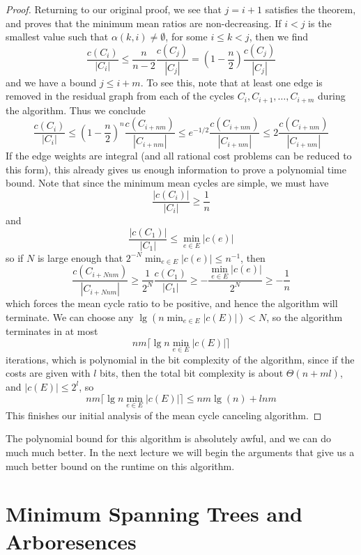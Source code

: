 \begin{proof}
    Returning to our original proof, we see that $j = i+1$ satisfies the theorem, and proves that the minimum mean ratios are non-decreasing. If $i < j$ is the smallest value such that $\alpha(k,i) \neq \emptyset$, for some $i \leq k < j$, then we find
    \[ \frac{c(C_i)}{|C_i|} \leq \frac{n}{n - 2} \frac{c(C_j)}{|C_j|} = \left(1 - \frac{n}{2} \right) \frac{c(C_j)}{|C_j|} \]
    and we have a bound $j \leq i + m$. To see this, note that at least one edge is removed in the residual graph from each of the cycles $C_i, C_{i+1}, \dots, C_{i+m}$ during the algorithm. Thus we conclude
    \[ \frac{c(C_i)}{|C_i|} \leq \left( 1 - \frac{n}{2} \right)^n \frac{c(C_{i+nm})}{|C_{i+nm}|} \leq e^{-1/2} \frac{c(C_{i+nm})}{|C_{i+nm}|} \leq 2 \frac{c(C_{i+nm})}{|C_{i+nm}|} \]
    If the edge weights are integral (and all rational cost problems can be reduced to this form), this already gives us enough information to prove a polynomial time bound. Note that since the minimum mean cycles are simple, we must have
    \[ \frac{|c(C_i)|}{|C_i|} \geq \frac{1}{n} \]
    and
    \[ \frac{|c(C_1)|}{|C_1|} \leq \min_{e \in E} |c(e)| \]
    so if $N$ is large enough that $2^{-N} \min_{e \in E} |c(e)| \leq n^{-1}$, then
    \[ \frac{c(C_{i+Nnm})}{|C_{i+Nnm}|} \geq \frac{1}{2^N} \frac{c(C_1)}{|C_1|} \geq - \frac{\min_{e \in E} |c(e)|}{2^N} \geq -\frac{1}{n} \]
    which forces the mean cycle ratio to be positive, and hence the algorithm will terminate. We can choose any $\lg(n \min_{e \in E} |c(E)|) < N$, so the algorithm terminates in at most
    \[ nm  \lceil \lg n \min_{e \in E} |c(E)| \rceil \]
    iterations, which is polynomial in the bit complexity of the algorithm, since if the costs are given with $l$ bits, then the total bit complexity is about $\Theta(n + ml)$, and $|c(E)| \leq 2^l$, so
    \[ nm \lceil \lg n \min_{e \in E} |c(E)| \rceil \leq nm \lg(n) + lnm \]
    This finishes our initial analysis of the mean cycle canceling algorithm.
\end{proof}

The polynomial bound for this algorithm is absolutely awful, and we can do much much better. In the next lecture we will begin the arguments that give us a much better bound on the runtime on this algorithm.

\section{Minimum Spanning Trees and Arboresences}

